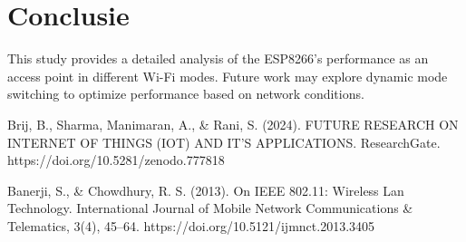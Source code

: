 \documentclass[conference]{IEEEtran}
\begin{document}
\section{Conclusie}
This study provides a detailed analysis of the ESP8266's performance as an access point in different Wi-Fi modes. Future work may explore dynamic mode switching to optimize performance based on network conditions. \lipsum[13]

\begin{thebibliography}{1}
 Brij, B., Sharma, Manimaran, A., \& Rani, S. (2024). FUTURE RESEARCH ON INTERNET OF THINGS (IOT) AND IT’S APPLICATIONS. ResearchGate. https://doi.org/10.5281/zenodo.777818

 Banerji, S., \& Chowdhury, R. S. (2013). On IEEE 802.11: Wireless Lan Technology. International Journal of Mobile Network Communications \& Telematics, 3(4), 45–64. https://doi.org/10.5121/ijmnct.2013.3405
\end{thebibliography}
\end{document}
